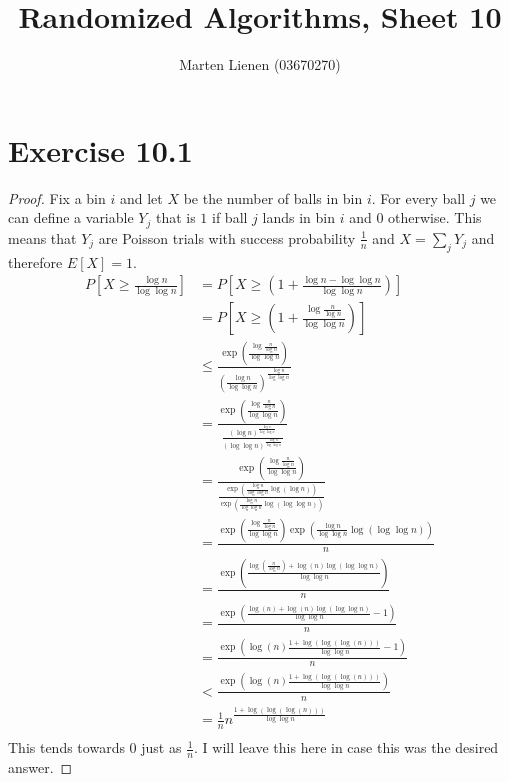 \documentclass[10pt,a4paper]{article}
\title{Randomized Algorithms, Sheet 10}
\author{Marten Lienen (03670270)}
\begin{document}
\maketitle

\section*{Exercise 10.1}

\begin{proof}
  Fix a bin $i$ and let $X$ be the number of balls in bin $i$.
  For every ball $j$ we can define a variable $Y_{j}$ that is $1$ if ball $j$ lands in bin $i$ and $0$ otherwise.
  This means that $Y_{j}$ are Poisson trials with success probability $\frac{1}{n}$ and $X = \sum_{j} Y_{j}$ and therefore $E[X] = 1$.
  \begin{align*}
    P\left[X \ge \frac{\log n}{\log \log n}\right] & = P\left[X \ge \left(1 + \frac{\log n - \log \log n}{\log \log n}\right)\right]\\
                                                   & = P\left[X \ge \left(1 + \frac{\log \frac{n}{\log n}}{\log \log n}\right)\right]\\
                                                   & \le \frac{\exp\left( \frac{\log \frac{n}{\log n}}{\log \log n} \right)}{\left( \frac{\log n}{\log \log n} \right)^{\frac{\log n}{\log \log n}}}\\
                                                   & = \frac{\exp\left( \frac{\log \frac{n}{\log n}}{\log \log n} \right)}{\frac{(\log n)^{\frac{\log n}{\log \log n}}}{(\log \log n)^{\frac{\log n}{\log \log n}}}}\\
                                                   & = \frac{\exp\left( \frac{\log \frac{n}{\log n}}{\log \log n} \right)}{\frac{\exp\left(\frac{\log n}{\log \log n} \log(\log n)\right)}{\exp\left(\frac{\log n}{\log \log n}\log(\log \log n)\right)}}\\
                                                   & = \frac{\exp\left( \frac{\log \frac{n}{\log n}}{\log \log n} \right) \exp\left(\frac{\log n}{\log \log n}\log(\log \log n)\right)}{n}\\
                                                   & = \frac{\exp\left( \frac{\log\left(\frac{n}{\log n}\right) + \log(n) \log(\log \log n)}{\log \log n} \right)}{n}\\
                                                   & = \frac{\exp\left( \frac{\log(n) + \log(n) \log(\log \log n)}{\log \log n} - 1\right)}{n}\\
                                                   & = \frac{\exp\left( \log(n)\frac{1 + \log(\log(\log(n)))}{\log \log n} - 1\right)}{n}\\
                                                   & < \frac{\exp\left( \log(n)\frac{1 + \log(\log(\log(n)))}{\log \log n} \right)}{n}\\
                                                   & = \frac{1}{n}n^{\frac{1 + \log(\log(\log(n)))}{\log \log n}}\\
  \end{align*}
  This tends towards $0$ just as $\frac{1}{n}$.
  I will leave this here in case this was the desired answer.
\end{proof}
\end{document}
